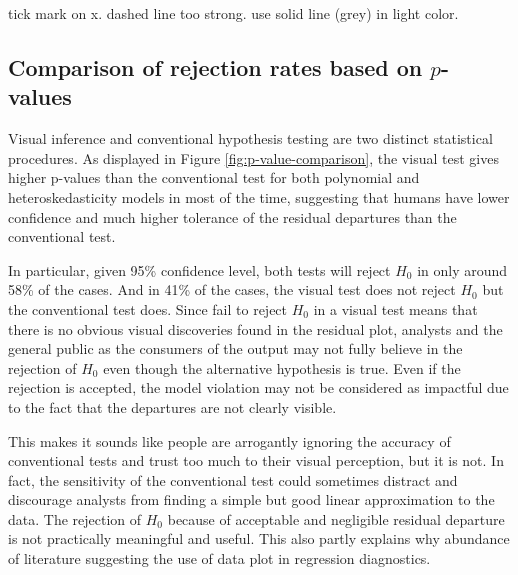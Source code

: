 \documentclass[]{interact}
\theoremstyle{plain}%
\theoremstyle{definition}
\theoremstyle{remark}
\begin{document}
tick mark on x. dashed line too strong. use solid line (grey) in light
color.

\hypertarget{comparison-of-rejection-rates-based-on-p-values}{%
\subsection{\texorpdfstring{Comparison of rejection rates based on
\(p\)-values}{Comparison of rejection rates based on p-values}}\label{comparison-of-rejection-rates-based-on-p-values}}

Visual inference and conventional hypothesis testing are two distinct
statistical procedures. As displayed in Figure
\ref{fig:p-value-comparison}, the visual test gives higher p-values than
the conventional test for both polynomial and heteroskedasticity models
in most of the time, suggesting that humans have lower confidence and
much higher tolerance of the residual departures than the conventional
test.

In particular, given 95\% confidence level, both tests will reject
\(H_0\) in only around 58\% of the cases. And in 41\% of the cases, the
visual test does not reject \(H_0\) but the conventional test does.
Since fail to reject \(H_0\) in a visual test means that there is no
obvious visual discoveries found in the residual plot, analysts and the
general public as the consumers of the output may not fully believe in
the rejection of \(H_0\) even though the alternative hypothesis is true.
Even if the rejection is accepted, the model violation may not be
considered as impactful due to the fact that the departures are not
clearly visible.

This makes it sounds like people are arrogantly ignoring the accuracy of
conventional tests and trust too much to their visual perception, but it
is not. In fact, the sensitivity of the conventional test could
sometimes distract and discourage analysts from finding a simple but
good linear approximation to the data. The rejection of \(H_0\) because
of acceptable and negligible residual departure is not practically
meaningful and useful. This also partly explains why abundance of
literature suggesting the use of data plot in regression diagnostics.
\end{document}
